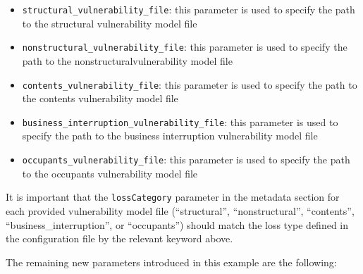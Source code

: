 \begin{itemize}

  \item \Verb+structural_vulnerability_file+: this parameter is used to
    specify the path to the structural \gls{vulnerability model} file

  \item \Verb+nonstructural_vulnerability_file+: this parameter is used to
    specify the path to the nonstructural\gls{vulnerability model} file

  \item \Verb+contents_vulnerability_file+: this parameter is used to
    specify the path to the contents \gls{vulnerability model} file

  \item \Verb+business_interruption_vulnerability_file+: this parameter is
    used to specify the path to the business interruption
    \gls{vulnerability model} file

  \item \Verb+occupants_vulnerability_file+: this parameter is used to
    specify the path to the occupants \gls{vulnerability model} file

\end{itemize}

It is important that the \Verb+lossCategory+ parameter in the metadata section
for each provided vulnerability model file (``structural'', ``nonstructural'',
``contents'', ``business\_interruption'', or ``occupants'') should match the
loss type defined in the configuration file by the relevant keyword above.

The remaining new parameters introduced in this example are the following:

